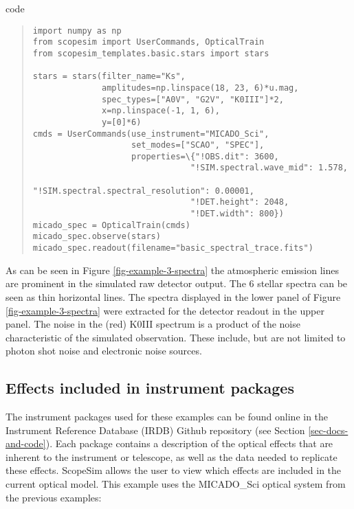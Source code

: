 \label{code-example-3-spectra}
\begin{DUclass}{code}
\begin{quote}
\begin{alltt}
\begin{minipage}[c]{0.95\textwidth}
\begin{lstlisting}[frame=single]
import numpy as np
from scopesim import UserCommands, OpticalTrain
from scopesim_templates.basic.stars import stars

stars = stars(filter_name="Ks",
              amplitudes=np.linspace(18, 23, 6)*u.mag,
              spec_types=["A0V", "G2V", "K0III"]*2,
              x=np.linspace(-1, 1, 6),
              y=[0]*6)
cmds = UserCommands(use_instrument="MICADO_Sci",
                    set_modes=["SCAO", "SPEC"],
                    properties=\{"!OBS.dit": 3600,
                                "!SIM.spectral.wave_mid": 1.578,
                                "!SIM.spectral.spectral_resolution": 0.00001,
                                "!DET.height": 2048,
                                "!DET.width": 800})
micado_spec = OpticalTrain(cmds)
micado_spec.observe(stars)
micado_spec.readout(filename="basic_spectral_trace.fits")
\end{lstlisting}
\end{minipage}
\end{alltt}
\end{quote}
\end{DUclass}

As can be seen in Figure \ref{fig-example-3-spectra} the atmospheric emission lines are prominent in the simulated raw detector output.
The 6 stellar spectra can be seen as thin horizontal lines.
The spectra displayed in the lower panel of Figure \ref{fig-example-3-spectra} were extracted for the detector readout in the upper panel.
The noise in the (red) K0III spectrum is a product of the noise characteristic of the simulated observation.
These include, but are not limited to photon shot noise and electronic noise sources.


\subsection{Effects included in instrument packages%
  \label{effects-included-in-instrument-packages}%
}

The instrument packages used for these examples can be found online in the Instrument Reference Database (IRDB) Github repository (see Section \ref{sec-docs-and-code}).
Each package contains a description of the optical effects that are inherent to the instrument or telescope, as well as the data needed to replicate these effects.
ScopeSim allows the user to view which effects are included in the current optical model.
This example uses the MICADO\_Sci optical system from the previous examples:

